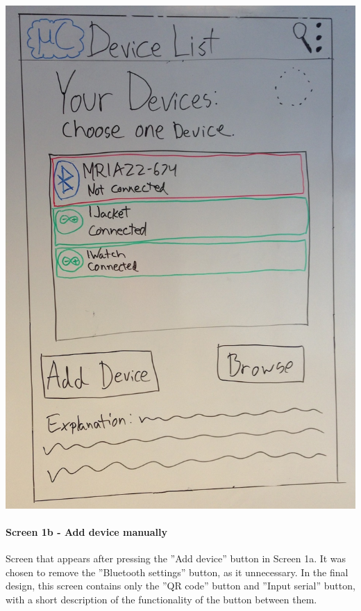 \begin{image}[H]
\includegraphics[scale=0.2]{images/Design_guide/Screen1a.png}
\end{image}


\paragraph{Screen 1b - Add device manually}
Screen that appears after pressing the ''Add device'' button in Screen 1a. It was chosen to remove the ''Bluetooth settings'' button, as it unnecessary. In the final design, this screen contains only the ''QR code'' button and ''Input serial'' button, with a short description of the functionality of the button between them.


